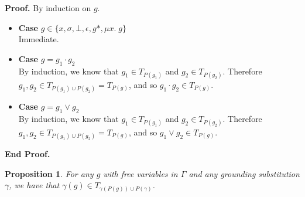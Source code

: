 \documentclass{article}
\newcommand{\fix}[2]{\mu {#1}.\;{#2}}
\newcommand{\setof}[1]{\{{#1}\}}
\newcommand{\pieces}[1]{P({#1})}
\newtheorem{prop}{Proposition}
\newenvironment{proof}{\noindent\textbf{Proof.}}{\noindent\textbf{End Proof.}}
\newenvironment{caseblock}{\begin{itemize}}{\end{itemize}}
\newenvironment{case}[1]{\item \textbf{Case} {#1}\\}{}
\begin{document}
\begin{proof}
  By induction on $g$. 

  \begin{caseblock}
    \begin{case}{$g \in \setof{x, \sigma, \bot, \epsilon, g*, \fix{x}{g}}$}
      Immediate. 
    \end{case}
    
    \begin{case}{$g = g_1 \cdot g_2$}
      By induction, we know that $g_1 \in T_{\pieces{g_1}}$ and $g_2 \in T_{\pieces{g_2}}$. 
      Therefore $g_1, g_2 \in T_{\pieces{g_1} \cup \pieces{g_2}} = T_{\pieces{g}}$, and so $g_1 \cdot g_2 \in T_{\pieces{g}}$. 
    \end{case}

    \begin{case}{$g = g_1 \vee g_2$}
      By induction, we know that $g_1 \in T_{\pieces{g_1}}$ and $g_2 \in T_{\pieces{g_2}}$. 
      Therefore $g_1, g_2 \in T_{\pieces{g_1} \cup \pieces{g_2}} = T_{\pieces{g}}$, and so $g_1 \vee g_2 \in T_{\pieces{g}}$. 
    \end{case}
  \end{caseblock}
\end{proof}

\begin{prop}{}
  For any $g$ with free variables in $\Gamma$ and any grounding substitution $\gamma$, we 
  have that $\gamma(g) \in T_{\gamma(\pieces{g}) \cup \pieces{\gamma}}$. 
\end{prop}
\end{document}
